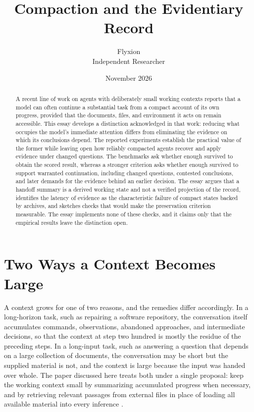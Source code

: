 \documentclass[11pt]{article}
\title{Compaction and the Evidentiary Record}
\author{Flyxion\\Independent Researcher}
\date{November 2026}
\begin{document}
\maketitle

\begin{abstract}
\noindent A recent line of work on agents with deliberately small working contexts reports that a model can often continue a substantial task from a compact account of its own progress, provided that the documents, files, and environment it acts on remain accessible. This essay develops a distinction acknowledged in that work: reducing what occupies the model's immediate attention differs from eliminating the evidence on which its conclusions depend. The reported experiments establish the practical value of the former while leaving open how reliably compacted agents recover and apply evidence under changed questions. The benchmarks ask whether enough survived to obtain the scored result, whereas a stronger criterion asks whether enough survived to support warranted continuation, including changed questions, contested conclusions, and later demands for the evidence behind an earlier decision. The essay argues that a handoff summary is a derived working state and not a verified projection of the record, identifies the latency of evidence as the characteristic failure of compact states backed by archives, and sketches checks that would make the preservation criterion measurable. The essay implements none of these checks, and it claims only that the empirical results leave the distinction open.
\end{abstract}

\section{Two Ways a Context Becomes Large}

A context grows for one of two reasons, and the remedies differ accordingly. In a long-horizon task, such as repairing a software repository, the conversation itself accumulates commands, observations, abandoned approaches, and intermediate decisions, so that the context at step two hundred is mostly the residue of the preceding steps. In a long-input task, such as answering a question that depends on a large collection of documents, the conversation may be short but the supplied material is not, and the context is large because the input was handed over whole. The paper discussed here treats both under a single proposal: keep the working context small by summarizing accumulated progress when necessary, and by retrieving relevant passages from external files in place of loading all available material into every inference \cite{paper}.
\end{document}
